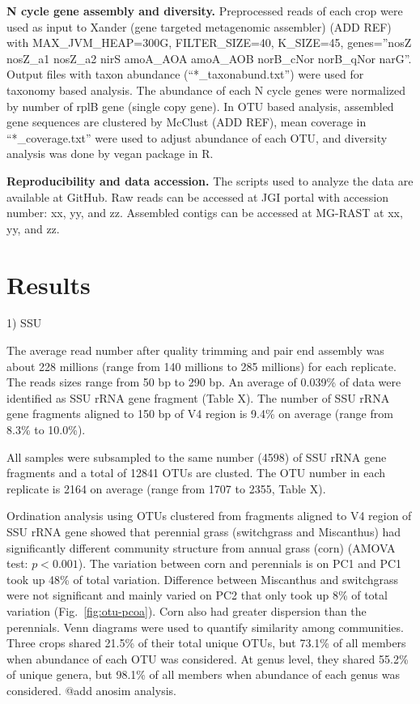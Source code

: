 \documentclass[12pt]{article}
\begin{document}
{\bf N cycle gene assembly and diversity.}
Preprocessed reads of each crop were used as input to Xander (gene targeted metagenomic assembler) (ADD REF) with MAX\_JVM\_HEAP=300G, FILTER\_SIZE=40, K\_SIZE=45, genes=''nosZ nosZ\_a1 nosZ\_a2 nirS amoA\_AOA amoA\_AOB norB\_cNor norB\_qNor narG''. Output files with taxon abundance (``*\_taxonabund.txt'') were used for taxonomy based analysis. The abundance of each N cycle genes were normalized by number of rplB gene (single copy gene). In OTU based analysis, assembled gene sequences are clustered by McClust (ADD REF), mean coverage in ``*\_coverage.txt'' were used to adjust abundance of each OTU, and diversity analysis was done by vegan package in R.

{\bf Reproducibility and data accession.}
The scripts used to analyze the data are available at GitHub. Raw reads can be accessed at JGI portal with accession number: xx, yy, and zz. Assembled contigs can be accessed at MG-RAST at xx, yy, and zz.

\section{Results}

1) SSU

The average read number after quality trimming and pair end assembly was about 228 millions (range from 140 millions to 285 millions) for each replicate. The reads sizes range from 50 bp to 290 bp. An average of 0.039\% of data were identified as SSU rRNA gene fragment (Table X). The number of SSU rRNA gene fragments aligned to 150 bp of V4 region is 9.4\% on average (range from 8.3\% to 10.0\%).

All samples were subsampled to the same number (4598) of SSU rRNA gene fragments and a total of 12841 OTUs are clusted. The OTU number in each replicate is 2164 on average (range from 1707 to 2355, Table X).

Ordination analysis using OTUs clustered from fragments aligned to V4 region of SSU rRNA gene showed that perennial grass (switchgrass and Miscanthus) had significantly different community structure from annual grass (corn) (AMOVA test: $p < 0.001$). The variation between corn and perennials is on PC1 and PC1 took up 48\% of total variation. Difference between Miscanthus and switchgrass were not significant and mainly varied on PC2 that only took up 8\% of total variation (Fig.~\ref{fig:otu-pcoa}). Corn also had greater dispersion than the perennials. Venn diagrams were used to quantify similarity among communities. Three crops shared 21.5\% of their total unique OTUs, but 73.1\% of all members when abundance of each OTU was considered. At genus level, they shared 55.2\% of unique genera, but 98.1\% of all members when abundance of each genus was considered. @add anosim analysis.
\end{document}
